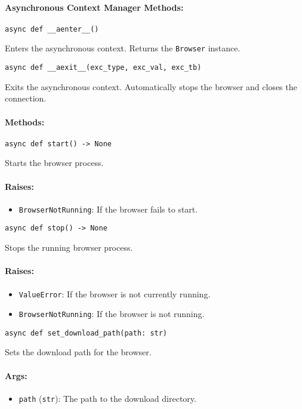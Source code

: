 \documentclass{article}
\begin{document}
\paragraph{Asynchronous Context Manager Methods:}
\noindent\texttt{async def \_\_aenter\_\_()}

\noindent Enters the asynchronous context. Returns the \texttt{Browser} instance.

\noindent\texttt{async def \_\_aexit\_\_(exc\_type, exc\_val, exc\_tb)}

\noindent Exits the asynchronous context. Automatically stops the browser and closes the connection.

\paragraph{Methods:}
\noindent\texttt{async def start() -> None}

\noindent Starts the browser process.

\paragraph{Raises:}
\begin{itemize}
    \item \texttt{BrowserNotRunning}: If the browser fails to start.
\end{itemize}

\noindent\texttt{async def stop() -> None}

\noindent Stops the running browser process.

\paragraph{Raises:}
\begin{itemize}
    \item \texttt{ValueError}: If the browser is not currently running.
    \item \texttt{BrowserNotRunning}: If the browser is not running.
\end{itemize}

\noindent\texttt{async def set\_download\_path(path: str)}

\noindent Sets the download path for the browser.

\paragraph{Args:}
\begin{itemize}
    \item \texttt{path} (\texttt{str}): The path to the download directory.
\end{itemize}
\end{document}
